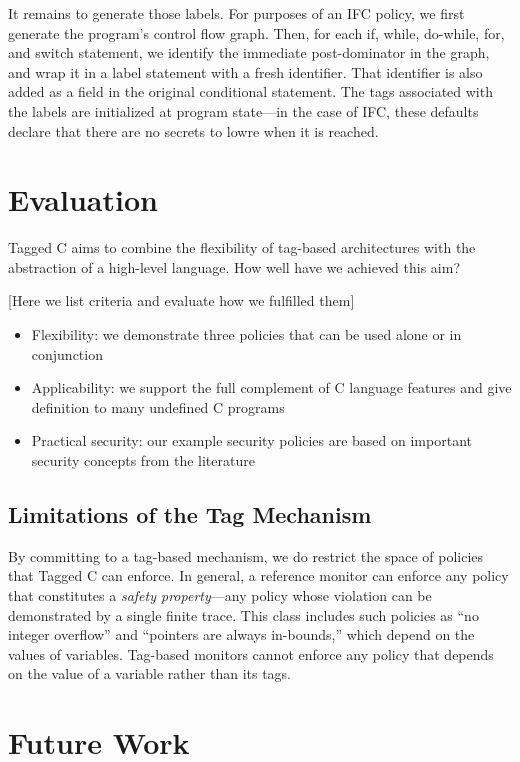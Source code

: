 \documentclass[acmsmall,review,anonymous]{acmart}\settopmatter{printfolios=true,printccs=false,printacmref=false}
\begin{document}
It remains to generate those labels. For purposes of an IFC policy, we first generate the program's
control flow graph. Then, for each if, while, do-while, for, and switch statement, we identify the
immediate post-dominator in the graph, and wrap it in a label statement with a fresh identifier.
That identifier is also added as a field in the original conditional statement. The tags
associated with the labels are initialized at program state---in the case of IFC, these defaults
declare that there are no secrets to lowre when it is reached.

\section{Evaluation}
\label{sec:evaluation}

Tagged C aims to combine the flexibility of tag-based architectures with the abstraction
of a high-level language. How well have we achieved this aim?

[Here we list criteria and evaluate how we fulfilled them]

\begin{itemize}
\item Flexibility: we demonstrate three policies that can be used alone or in conjunction
\item Applicability: we support the full complement of C language features and give definition
  to many undefined C programs
\item Practical security: our example security policies are based on important security concepts
  from the literature
\end{itemize}

\subsection{Limitations of the Tag Mechanism}

By committing to a tag-based mechanism, we do restrict the space of policies that Tagged C
can enforce. In general, a reference monitor can enforce any policy that constitutes a
{\em safety property}---any policy whose violation can be demonstrated by a single finite
trace. This class includes such policies as ``no integer overflow'' and ``pointers are always in-bounds,''
which depend on the values of variables. Tag-based monitors cannot enforce any policy that
depends on the value of a variable rather than its tags.

\section{Future Work}
\label{sec:futurework}
\end{document}
